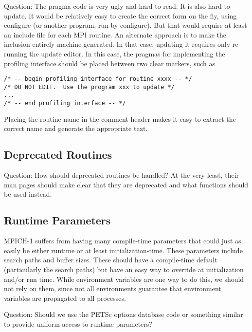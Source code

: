 \documentclass{article}
\begin{document}
Question: The pragma code is very ugly and hard to read.  It is also hard to
update.
It would be relatively
easy to create the correct form on the fly, using configure (or
another program, run by configure).  But that
would require at least an include file for each MPI routine.
An alternate approach is to make the inclusion entirely machine
generated.  In that case, updating it requires only re-running the
update editor.  In this case, the pragmas for implementing the
profiling interface should be placed between two clear markers, such
as 
\begin{verbatim}
/* -- begin profiling interface for routine xxxx -- */
/* DO NOT EDIT.  Use the program xxx to update */
...
/* -- end profiling interface -- */
\end{verbatim}

Placing the routine name in the comment header makes it easy to
extract the correct name and generate the appropriate text.

\subsection{Deprecated Routines}
Question:  How should deprecated routines be handled?  At the very
least, their man pages should make clear that they are deprecated and
what functions should be used instead.

\subsection{Runtime Parameters}
\label{sec:runtime-params}
MPICH-1 suffers from having many compile-time parameters that could just as
easily be either runtime or at least initialization-time.  These parameters
include search paths and buffer sizes.  These should have a compile-time
default (particularly the search paths) but have an easy way to override at
initialization and/or run time.  While environment variables are one way to do
this, we should not rely on them, since not all environments guarantee that
environment variables are propagated to all processes.

Question: Should we use the PETSc options database code or something similar
to provide uniform access to runtime parameters?  
\end{document}
